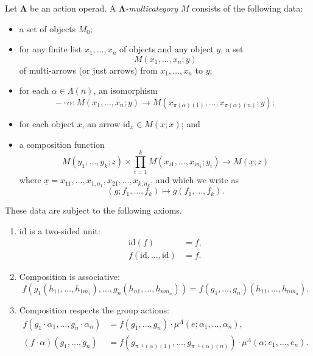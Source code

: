 \documentclass{amsbook} %
\newcommand{\mb}{\mathbf}
\newcommand{\id}{\textrm{id}}
\numberwithin{section}{chapter}
\begin{document}
\begin{Defi}\label{lambda_multicat}
Let $\mb{\Lambda}$ be an action operad.  A \emph{$\mb{\Lambda}$-multicategory} $M$ consists of the following data:
\begin{itemize}
  \item a set of objects $M_{0}$;
  \item for any finite list $x_{1}, \ldots, x_{n}$ of objects and any object $y$, a set
    \[
      M(x_{1}, \ldots, x_{n}; y)
    \]
  of multi-arrows (or just arrows) from $x_{1}, \ldots, x_{n}$ to $y$;
  \item for each $\alpha \in \Lambda(n)$, an isomorphism
    \[
      -\cdot \alpha \colon M(x_{1}, \ldots, x_{n}; y) \rightarrow M\left(x_{\pi(\alpha)(1)}, \ldots, x_{\pi(\alpha)(n)}; y\right);
    \]
  \item for each object $x$, an arrow $\id_{x} \in M(x;x)$; and
  \item a composition function
    \[
      M(y_1,\ldots,y_k;z) \times \prod_{i=1}^k M(x_{i1},\ldots,x_{in_i};y_i) \rightarrow M(\underline{x};z)
    \]
  where $\underline{x} = x_{11}, \ldots, x_{1,n_{1}}, x_{21}, \ldots, x_{k,n_{k}}$, and which we write as
    \[
      (g; f_{1}, \ldots, f_{k}) \mapsto g(f_{1}, \ldots, f_{k}).
    \]
\end{itemize}
These data are subject to the following axioms.
\begin{enumerate}
\item $\id$ is a two-sided unit:
  \begin{align*}
    \id(f) &= f, \\
    f(\id,\ldots,\id) &= f.
  \end{align*}
\item Composition is associative:
  \[
    f\left( g_{1}(h_{11}, \ldots, h_{1m_{1}}), \ldots, g_{n}(h_{n1}, \ldots, h_{nm_{n}}) \right) = f(g_{1}, \ldots, g_{n})(h_{11}, \ldots, h_{nm_{n}}).
  \]
\item Composition respects the group actions:
  \begin{align*}
    f(g_1 \cdot \alpha_1,\ldots, g_n \cdot \alpha_n) &= f(g_1,\ldots,g_n) \cdot \mu^{\Lambda}(e;\alpha_1,\ldots,\alpha_n), \\
    (f \cdot \alpha)(g_1,\ldots,g_n) &= f\left(g_{\pi^{-1}(\alpha)(1)},\ldots,g_{\pi^{-1}(\alpha)(n)}\right) \cdot \mu^{\Lambda}(\alpha;e_1,\ldots,e_n).
  \end{align*}
\end{enumerate}
\end{Defi}
\end{document}
